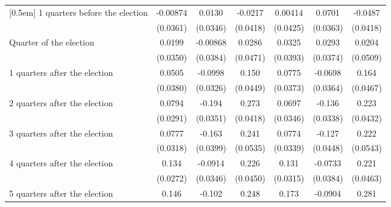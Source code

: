 \begin{table}[!ht]
\begin{tabular}{l*{6}{c}}
[0.5em]
 1 quarters before the election&    -0.00874         &      0.0130         &     -0.0217         &     0.00414         &      0.0701         &     -0.0487         \\
                    &    (0.0361)         &    (0.0346)         &    (0.0418)         &    (0.0425)         &    (0.0363)         &    (0.0418)         \\
[0.5em]
Quarter of the election&      0.0199         &    -0.00868         &      0.0286         &      0.0325         &      0.0293         &      0.0204         \\
                    &    (0.0350)         &    (0.0384)         &    (0.0471)         &    (0.0393)         &    (0.0374)         &    (0.0509)         \\
[0.5em]
 1 quarters after the election&      0.0505         &     -0.0998\sym{**} &       0.150\sym{***}&      0.0775\sym{*}  &     -0.0698         &       0.164\sym{***}\\
                    &    (0.0380)         &    (0.0326)         &    (0.0449)         &    (0.0373)         &    (0.0364)         &    (0.0467)         \\
[0.5em]
 2 quarters after the election&      0.0794\sym{**} &      -0.194\sym{***}&       0.273\sym{***}&      0.0697\sym{*}  &      -0.136\sym{***}&       0.223\sym{***}\\
                    &    (0.0291)         &    (0.0351)         &    (0.0418)         &    (0.0346)         &    (0.0338)         &    (0.0432)         \\
[0.5em]
 3 quarters after the election&      0.0777\sym{*}  &      -0.163\sym{***}&       0.241\sym{***}&      0.0774\sym{*}  &      -0.127\sym{**} &       0.222\sym{***}\\
                    &    (0.0318)         &    (0.0399)         &    (0.0535)         &    (0.0339)         &    (0.0448)         &    (0.0543)         \\
[0.5em]
 4 quarters after the election&       0.134\sym{***}&     -0.0914\sym{**} &       0.226\sym{***}&       0.131\sym{***}&     -0.0733         &       0.221\sym{***}\\
                    &    (0.0272)         &    (0.0346)         &    (0.0450)         &    (0.0315)         &    (0.0384)         &    (0.0463)         \\
[0.5em]
 5 quarters after the election&       0.146\sym{***}&      -0.102\sym{**} &       0.248\sym{***}&       0.173\sym{***}&     -0.0904\sym{**} &       0.281\sym{***}\\

\end{tabular}
\end{table}
